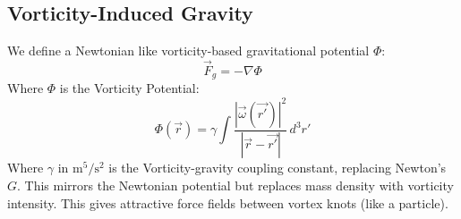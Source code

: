 \documentclass[aps,preprint,superscriptaddress]{revtex4}
\begin{document}
    \subsection*{Vorticity-Induced Gravity}
    We define a Newtonian like vorticity-based gravitational potential $\Phi$:
    \begin{equation}
        \vec{F}_g = -\nabla \Phi
    \end{equation}
    Where $\Phi$ is the Vorticity Potential:
    \begin{equation}
        \Phi(\vec{r}) = \gamma \int \frac{|\vec{\omega}(\vec{r'})|^2}{|\vec{r} - \vec{r'}|} \, d^3r'
    \end{equation}
    Where \textbf{$\gamma$} in \textbf{$\text{m}^5 / \text{s}^{2}$} is the Vorticity-gravity coupling constant, replacing Newton's $G$. This
mirrors
the Newtonian potential but replaces mass density with vorticity intensity. This gives attractive force fields between vortex knots (like a particle).


    
    
    
    
    
    
    


    
    



    \appendix \label{sec:Part-6}
    \label{appendix:1}
    \label{appendix:2}
\end{document}
